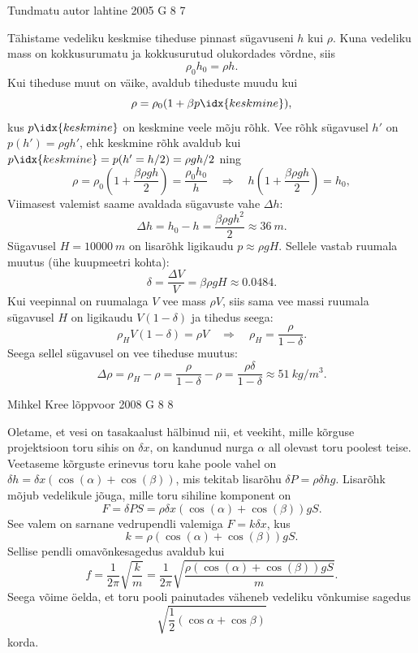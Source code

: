 \documentclass[11pt, twoside]{article}
\begin{document}
{%
{Tundmatu autor} %
{lahtine} %
{2005} %
{G 8} %
{7} %
{

\ifSolution
\osa Tähistame vedeliku keskmise tiheduse pinnast sügavuseni $h$ kui $\rho$. Kuna vedeliku mass on kokkusurumatu ja kokkusurutud olukordades võrdne, siis
\[
\rho_{0} h_{0}=\rho h.
\]
Kui tiheduse muut on väike, avaldub tiheduste muudu kui
\[
\rho = \rho_0 (1 + \beta p\idx{keskmine}),
\]
kus $p\idx{keskmine}$ on keskmine veele mõju rõhk. Vee rõhk sügavusel $h'$ on $p(h') = \rho gh'$, ehk keskmine rõhk avaldub kui $p\idx{keskmine} = p(h' = h/2) = \rho gh/2$ ning
\[
\rho=\rho_{0}\left(1+\frac{\beta \rho g h}{2}\right)=\frac{\rho_{0} h_{0}}{h} \quad \Rightarrow \quad h\left(1+\frac{\beta \rho g h}{2}\right)=h_{0},
\]
Viimasest valemist saame avaldada sügavuste vahe $\Delta h$:
\[
\Delta h=h_{0}-h=\frac{\beta \rho g h^{2}}{2} \approx \SI{36}{m}.
\]
\osa Sügavusel $H = \SI{10000}{m}$ on lisarõhk ligikaudu $p \approx \rho gH$. Sellele vastab ruumala muutus (ühe kuupmeetri kohta): 
\[
\delta=\frac{\Delta V}{V}=\beta \rho g H \approx \num{0,0484}.
\]
Kui veepinnal on ruumalaga $V$ vee mass $\rho V$, siis sama vee massi ruumala sügavusel $H$ on ligikaudu $V (1 - \delta )$ ja tihedus seega:
\[
\rho_{H} V(1-\delta)=\rho V \quad \Rightarrow \quad \rho_{H}=\frac{\rho}{1-\delta}.
\]
Seega sellel sügavusel on vee tiheduse muutus: 
\[
\Delta \rho=\rho_{H}-\rho=\frac{\rho}{1-\delta}-\rho=\frac{\rho \delta}{1-\delta} \approx \SI{51}{kg/m^3}.
\]
\fi
}

{Mihkel Kree} %
{lõppvoor} %
{2008} %
{G 8} %
{8} %
{

\ifSolution
Oletame, et vesi on tasakaalust hälbinud nii, et veekiht, mille kõrguse projektsioon toru sihis on $\delta x$, on kandunud nurga $\alpha$ all olevast toru poolest teise. Veetaseme kõrguste erinevus toru kahe poole vahel on $\delta h = \delta x (\cos (\alpha ) + \cos (\beta ))$, mis tekitab lisarõhu $\delta P = \rho \delta hg$. Lisarõhk mõjub vedelikule jõuga, mille toru sihiline komponent on
\[
F = \delta P S = \rho \delta x (\cos (\alpha ) + \cos (\beta )) gS.
\]
See valem on sarnane vedrupendli valemiga $F = k\delta x$, kus 
\[
k = \rho (\cos (\alpha ) + \cos (\beta )) gS.
\]
Sellise pendli omavõnkesagedus avaldub kui
\[
f = \frac{1}{2\pi} \sqrt{\frac{k}{m}} = \frac{1}{2\pi} \sqrt{\frac{\rho(\cos(\alpha)+\cos(\beta))gS}{m}}.
\]
Seega võime öelda, et toru pooli painutades väheneb vedeliku võnkumise sagedus
\[
\sqrt{\frac{1}{2}(\cos \alpha + \cos \beta)}
\]
korda.
\fi
}
\newpage
}
\end{document}
